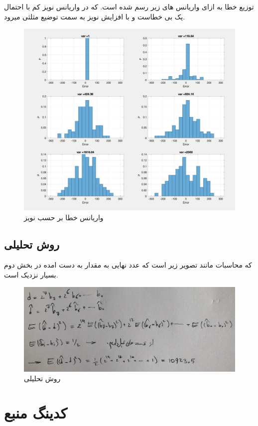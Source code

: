 \documentclass[10pt]{article}
\begin{document}
	\subsection{}
	توزیع خطا به ازای واریانس های زیر رسم شده است. که در واریانس نویز کم با احتمال یک بی خطاست و با افزایش نویز به سمت توضیع مثلثی میرود.
	\begin{figure}[H]
		\centering
		\includegraphics[width=0.8\linewidth]{../img/4.3}
		\caption{واریانس خطا بر حسب نویز}
		\label{fig:4-3}
	\end{figure}
	
	\newpage
	\subsection{روش تحلیلی}
	 که محاسبات مانند تصویر زیر است که عدد نهایی به مقدار به دست امده در بخش دوم بسیار نزدیک است.
	 
	 \begin{figure}[H]
	 	\centering
	 	\includegraphics[width=0.9\linewidth]{../img/4.4}
	 	\caption{روش تحلیلی}
	 	\label{fig:4-4}
	 \end{figure}	
	 	
	 \newpage	
	 \section{کدینگ منبع}
\end{document}
